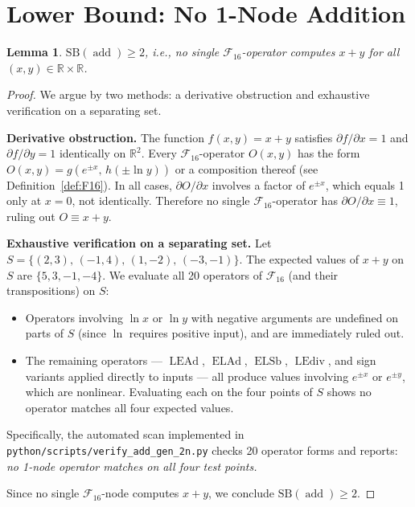 \documentclass[12pt,a4paper]{article}
\newtheorem{lemma}[theorem]{Lemma}
\theoremstyle{definition}
\newcommand{\ELAd}{\operatorname{ELAd}}
\newcommand{\ELSb}{\operatorname{ELSb}}
\newcommand{\LEAd}{\operatorname{LEAd}}
\newcommand{\LEdiv}{\operatorname{LEdiv}}
\newcommand{\addop}{\operatorname{add}}
\newcommand{\SB}{\mathrm{SB}}
\newcommand{\F}{\mathcal{F}_{16}}
\newcommand{\R}{\mathbb{R}}
\begin{document}
\section{Lower Bound: No 1-Node Addition}
\label{sec:lower}

\begin{lemma}
\label{lem:lb}
$\SB(\addop) \ge 2$, i.e., no single $\F$-operator computes $x + y$ for all
$(x, y) \in \R \times \R$.
\end{lemma}

\begin{proof}
We argue by two methods: a derivative obstruction and exhaustive verification
on a separating set.

\textbf{Derivative obstruction.}
The function $f(x,y) = x + y$ satisfies
$\partial f / \partial x = 1$ and $\partial f / \partial y = 1$ identically
on $\R^2$.
Every $\F$-operator $O(x, y)$ has the form
$O(x, y) = g(e^{\pm x},\, h(\pm \ln y))$ or a composition thereof (see
Definition~\ref{def:F16}).
In all cases, $\partial O / \partial x$ involves a factor of $e^{\pm x}$,
which equals 1 only at $x = 0$, not identically.
Therefore no single $\F$-operator has $\partial O / \partial x \equiv 1$,
ruling out $O \equiv x + y$.

\textbf{Exhaustive verification on a separating set.}
Let $S = \{(2,3),\,(-1,4),\,(1,-2),\,(-3,-1)\}$.
The expected values of $x + y$ on $S$ are $\{5, 3, -1, -4\}$.
We evaluate all 20 operators of $\F$ (and their transpositions) on $S$:
\begin{itemize}
  \item Operators involving $\ln x$ or $\ln y$ with negative arguments are
    undefined on parts of $S$ (since $\ln$ requires positive input), and are
    immediately ruled out.
  \item The remaining operators --- $\LEAd$, $\ELAd$, $\ELSb$, $\LEdiv$,
    and sign variants applied directly to inputs --- all produce values
    involving $e^{\pm x}$ or $e^{\pm y}$, which are nonlinear.
    Evaluating each on the four points of $S$ shows no operator matches
    all four expected values.
\end{itemize}
Specifically, the automated scan implemented in
\texttt{python/scripts/verify\_add\_gen\_2n.py} checks 20 operator forms and
reports: \emph{no 1-node operator matches on all four test points.}

Since no single $\F$-node computes $x + y$, we conclude $\SB(\addop) \ge 2$.
\end{proof}
\end{document}
